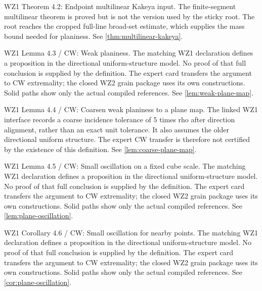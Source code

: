 \begin{remark}
\label{rem:atlas-T4_2}
WZ1 Theorem 4.2: Endpoint multilinear Kakeya input.
The finite-segment multilinear theorem is proved but is not the version used by the sticky root. The root reaches the cropped full-line broad-set estimate, which supplies the mass bound needed for planiness.
See \ref{thm:multilinear-kakeya}.
\end{remark}

\begin{remark}
\label{rem:atlas-L4_3}
WZ1 Lemma 4.3 / CW: Weak planiness.
The matching WZ1 declaration defines a proposition in the directional uniform-structure model. No proof of that full conclusion is supplied by the definition. The expert card transfers the argument to CW extremality; the closed WZ2 grain package uses its own constructions. Solid paths show only the actual compiled references.
See \ref{lem:weak-plane-map}.
\end{remark}

\begin{remark}
\label{rem:atlas-L4_4}
WZ1 Lemma 4.4 / CW: Coarsen weak planiness to a plane map.
The linked WZ1 interface records a coarse incidence tolerance of 5 times rho after direction alignment, rather than an exact unit tolerance. It also assumes the older directional uniform structure. The expert CW transfer is therefore not certified by the existence of this definition.
See \ref{lem:coarse-plane-map}.
\end{remark}

\begin{remark}
\label{rem:atlas-L4_5}
WZ1 Lemma 4.5 / CW: Small oscillation on a fixed cube scale.
The matching WZ1 declaration defines a proposition in the directional uniform-structure model. No proof of that full conclusion is supplied by the definition. The expert card transfers the argument to CW extremality; the closed WZ2 grain package uses its own constructions. Solid paths show only the actual compiled references.
See \ref{lem:plane-oscillation}.
\end{remark}

\begin{remark}
\label{rem:atlas-C4_6}
WZ1 Corollary 4.6 / CW: Small oscillation for nearby points.
The matching WZ1 declaration defines a proposition in the directional uniform-structure model. No proof of that full conclusion is supplied by the definition. The expert card transfers the argument to CW extremality; the closed WZ2 grain package uses its own constructions. Solid paths show only the actual compiled references.
See \ref{cor:plane-oscillation}.
\end{remark}

